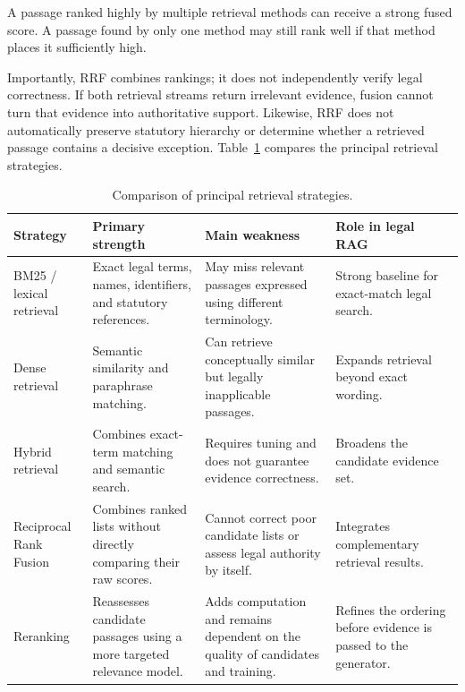 A passage ranked highly by multiple retrieval methods can receive a strong fused score. A passage
found by only one method may still rank well if that method places it sufficiently high.

Importantly, RRF combines rankings; it does not independently verify legal correctness. If both
retrieval streams return irrelevant evidence, fusion cannot turn that evidence into authoritative
support. Likewise, RRF does not automatically preserve statutory hierarchy or determine whether a
retrieved passage contains a decisive exception. Table~\ref{tab:retrstrat} compares the principal
retrieval strategies.

\begin{table}[tp]
\centering
\caption{Comparison of principal retrieval strategies.}
\label{tab:retrstrat}
\footnotesize
\setlength{\tabcolsep}{5pt}
\renewcommand{\arraystretch}{1.3}
\begin{tabularx}{\textwidth}{>{\raggedright\arraybackslash}p{2.9cm} >{\raggedright\arraybackslash}X >{\raggedright\arraybackslash}X >{\raggedright\arraybackslash}X}
\toprule
\textbf{Strategy} & \textbf{Primary strength} & \textbf{Main weakness} & \textbf{Role in legal RAG} \\
\midrule
BM25 / lexical retrieval & Exact legal terms, names, identifiers, and statutory references. & May miss relevant passages expressed using different terminology. & Strong baseline for exact-match legal search. \\
Dense retrieval & Semantic similarity and paraphrase matching. & Can retrieve conceptually similar but legally inapplicable passages. & Expands retrieval beyond exact wording. \\
Hybrid retrieval & Combines exact-term matching and semantic search. & Requires tuning and does not guarantee evidence correctness. & Broadens the candidate evidence set. \\
Reciprocal Rank Fusion & Combines ranked lists without directly comparing their raw scores. & Cannot correct poor candidate lists or assess legal authority by itself. & Integrates complementary retrieval results. \\
Reranking & Reassesses candidate passages using a more targeted relevance model. & Adds computation and remains dependent on the quality of candidates and training. & Refines the ordering before evidence is passed to the generator. \\
\bottomrule
\end{tabularx}
\end{table}

